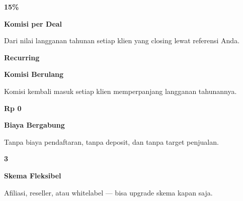 \documentclass[a4paper]{article}
\begin{document}
\noindent
\begin{minipage}[t]{0.485\textwidth}
    \noindent\colorbox{BlueBg}{%
        \begin{minipage}[t][2.7cm][c]{\dimexpr\linewidth-2\fboxsep\relax}
            \centering
            {\fontsize{20}{24}\selectfont\bfseries\color{BluePrimary} 15\%}\par\vspace{2pt}
            {\fontsize{9.5}{12}\selectfont\bfseries\color{BlueDark} Komisi per Deal}\par\vspace{2pt}
            {\fontsize{8.5}{11}\selectfont\color{TextDark}Dari nilai langganan tahunan setiap klien yang closing lewat referensi Anda.}
        \end{minipage}}\par
    \vspace{6pt}
    \noindent\colorbox{BlueBg}{%
        \begin{minipage}[t][2.7cm][c]{\dimexpr\linewidth-2\fboxsep\relax}
            \centering
            {\fontsize{20}{24}\selectfont\bfseries\color{BluePrimary} Recurring}\par\vspace{2pt}
            {\fontsize{9.5}{12}\selectfont\bfseries\color{BlueDark} Komisi Berulang}\par\vspace{2pt}
            {\fontsize{8.5}{11}\selectfont\color{TextDark}Komisi kembali masuk setiap klien memperpanjang langganan tahunannya.}
        \end{minipage}}%
\end{minipage}%
\hfill
\begin{minipage}[t]{0.485\textwidth}
    \noindent\colorbox{BlueBg}{%
        \begin{minipage}[t][2.7cm][c]{\dimexpr\linewidth-2\fboxsep\relax}
            \centering
            {\fontsize{20}{24}\selectfont\bfseries\color{BluePrimary} Rp 0}\par\vspace{2pt}
            {\fontsize{9.5}{12}\selectfont\bfseries\color{BlueDark} Biaya Bergabung}\par\vspace{2pt}
            {\fontsize{8.5}{11}\selectfont\color{TextDark}Tanpa biaya pendaftaran, tanpa deposit, dan tanpa target penjualan.}
        \end{minipage}}\par
    \vspace{6pt}
    \noindent\colorbox{BlueBg}{%
        \begin{minipage}[t][2.7cm][c]{\dimexpr\linewidth-2\fboxsep\relax}
            \centering
            {\fontsize{20}{24}\selectfont\bfseries\color{BluePrimary} 3}\par\vspace{2pt}
            {\fontsize{9.5}{12}\selectfont\bfseries\color{BlueDark} Skema Fleksibel}\par\vspace{2pt}
            {\fontsize{8.5}{11}\selectfont\color{TextDark}Afiliasi, reseller, atau whitelabel --- bisa upgrade skema kapan saja.}
        \end{minipage}}%
\end{minipage}
\end{document}

